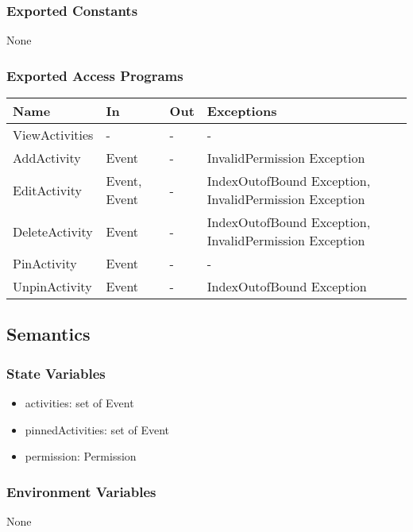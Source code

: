\documentclass[12pt, titlepage]{article}
\begin{document}
\subsubsection{Exported Constants}

None

\subsubsection{Exported Access Programs}
\begin{center}
\begin{tabular}{p{4cm} p{2cm} p{4cm} p{4cm}}
\hline
\textbf{Name} & \textbf{In} & \textbf{Out} & \textbf{Exceptions} \\
\hline
ViewActivities & - & - & - \\
AddActivity & Event & - & InvalidPermission Exception \\
EditActivity & Event, Event & - & IndexOutofBound Exception, InvalidPermission Exception \\
DeleteActivity & Event & - & IndexOutofBound Exception, InvalidPermission Exception \\
PinActivity & Event & - & - \\
UnpinActivity & Event & - & IndexOutofBound Exception \\
\hline
\end{tabular}
\end{center}

\subsection{Semantics}

\subsubsection{State Variables}

\begin{itemize}
  \item activities: set of Event
  \item pinnedActivities: set of Event
  \item permission: Permission
\end{itemize}

\subsubsection{Environment Variables}

None
\end{document}
